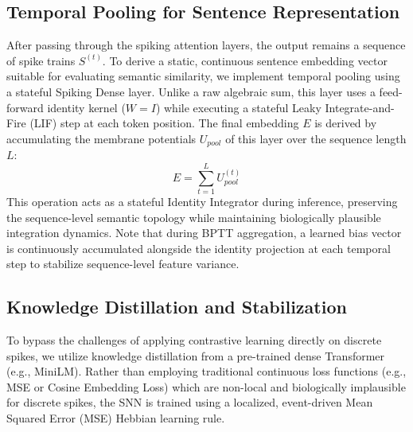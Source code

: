 \documentclass{article} %
\begin{document}
\subsection{Temporal Pooling for Sentence Representation}
After passing through the spiking attention layers, the output remains a sequence of spike trains $S^{(t)}$. To derive a static, continuous sentence embedding vector suitable for evaluating semantic similarity, we implement temporal pooling using a stateful Spiking Dense layer. Unlike a raw algebraic sum, this layer uses a feed-forward identity kernel ($W = I$) while executing a stateful Leaky Integrate-and-Fire (LIF) step at each token position. The final embedding $E$ is derived by accumulating the membrane potentials $U_{pool}$ of this layer over the sequence length $L$:
\begin{equation}
E = \sum_{t=1}^{L} U_{pool}^{(t)}
\end{equation}
This operation acts as a stateful Identity Integrator during inference, preserving the sequence-level semantic topology while maintaining biologically plausible integration dynamics. Note that during BPTT aggregation, a learned bias vector is continuously accumulated alongside the identity projection at each temporal step to stabilize sequence-level feature variance.

\subsection{Knowledge Distillation and Stabilization}
To bypass the challenges of applying contrastive learning directly on discrete spikes, we utilize knowledge distillation from a pre-trained dense Transformer (e.g., MiniLM). Rather than employing traditional continuous loss functions (e.g., MSE or Cosine Embedding Loss) which are non-local and biologically implausible for discrete spikes, the SNN is trained using a localized, event-driven Mean Squared Error (MSE) Hebbian learning rule. 
\end{document}
